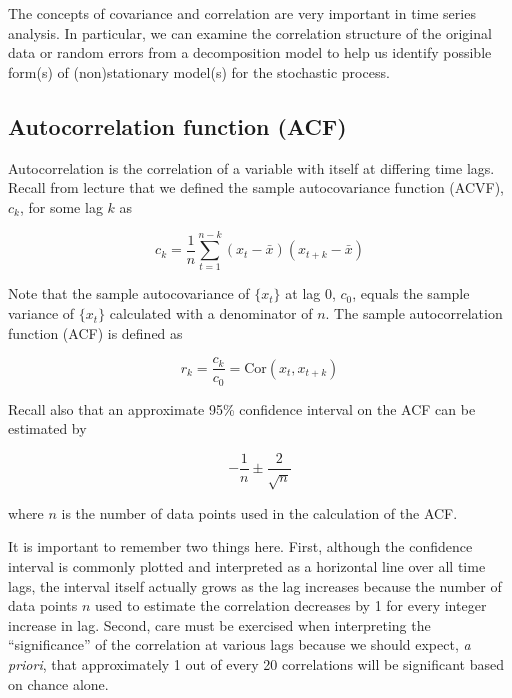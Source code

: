 The concepts of covariance and correlation are very important in time series analysis.  In particular, we can examine the correlation structure of the original data or random errors from a decomposition model to help us identify possible form(s) of (non)stationary model(s) for the stochastic process.

\subsection{Autocorrelation function (ACF)}

Autocorrelation is the correlation of a variable with itself at differing time lags. Recall from lecture that we defined the sample autocovariance function (ACVF), $c_k$, for some lag $k$ as

\begin{equation}\label{eqn:ACVF}
c_k = \frac{1}{n}\sum_{t=1}^{n-k} \left(x_t-\bar{x}\right) \left(x_{t+k}-\bar{x}\right)
\end{equation}

\noindent Note that the sample autocovariance of $\{x_t\}$ at lag 0, $c_0$, equals the sample variance of $\{x_t\}$ calculated with a denominator of $n$.  The sample autocorrelation function (ACF) is defined as

\begin{equation}\label{eqn:ACF}
r_k = \frac{c_k}{c_0} = \text{Cor}(x_t,x_{t+k})
\end{equation}

Recall also that an approximate 95\% confidence interval on the ACF can be estimated by

\begin{equation}\label{eqn:ACF95CI}
-\frac{1}{n} \pm \frac{2}{\sqrt{n}}
\end{equation}

\noindent where $n$ is the number of data points used in the calculation of the ACF.

It is important to remember two things here.  First, although the confidence interval is commonly plotted and interpreted as a horizontal line over all time lags, the interval itself actually grows as the lag increases because the number of data points $n$ used to estimate the correlation decreases by 1 for every integer increase in lag.  Second, care must be exercised when interpreting the ``significance'' of the correlation at various lags because we should expect, \emph{a priori}, that approximately 1 out of every 20 correlations will be significant based on chance alone.

